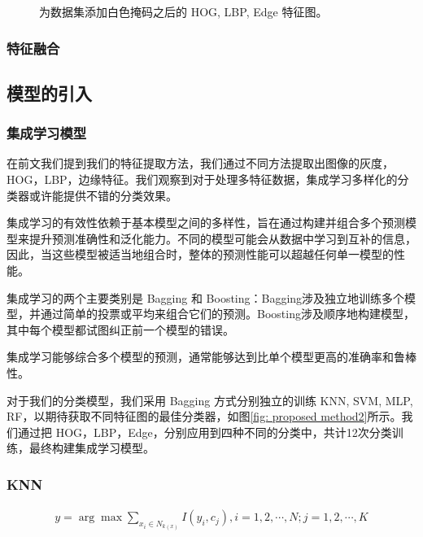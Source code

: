 \documentclass[a4paper, 10pt]{article}
\begin{document}
\begin{figure}[htbp]
		\caption{
			\label{fig: alldata filled}
			为数据集添加白色掩码之后的 HOG, LBP, Edge 特征图。
		}
	\end{figure}
	
	
	\subsubsection{特征融合}
	
	\subsection{模型的引入}
	
	\subsubsection{集成学习模型}
	
	在前文我们提到我们的特征提取方法，我们通过不同方法提取出图像的灰度，HOG，LBP，边缘特征。我们观察到对于处理多特征数据，集成学习多样化的分类器或许能提供不错的分类效果。
	
	集成学习的有效性依赖于基本模型之间的多样性，旨在通过构建并组合多个预测模型来提升预测准确性和泛化能力。不同的模型可能会从数据中学习到互补的信息，因此，当这些模型被适当地组合时，整体的预测性能可以超越任何单一模型的性能。
	
	集成学习的两个主要类别是 Bagging 和 Boosting：Bagging涉及独立地训练多个模型，并通过简单的投票或平均来组合它们的预测。Boosting涉及顺序地构建模型，其中每个模型都试图纠正前一个模型的错误。
	
	集成学习能够综合多个模型的预测，通常能够达到比单个模型更高的准确率和鲁棒性。

	对于我们的分类模型，我们采用 Bagging 方式分别独立的训练 KNN, SVM, MLP, RF，以期待获取不同特征图的最佳分类器，如图\ref{fig: proposed method2}所示。我们通过把 HOG，LBP，Edge，分别应用到四种不同的分类中，共计12次分类训练，最终构建集成学习模型。
	
	\subsubsection{KNN}
	
	\begin{equation}
		\begin{aligned}
			y = \arg\max \sum_{x_i \in N_{k(x)}} I \left(y_i, c_j\right), i = 1,2, \cdots, N; j = 1,2, \cdots, K
		\end{aligned}
		\label{eq: knn}
	\end{equation}
	
\end{document}
